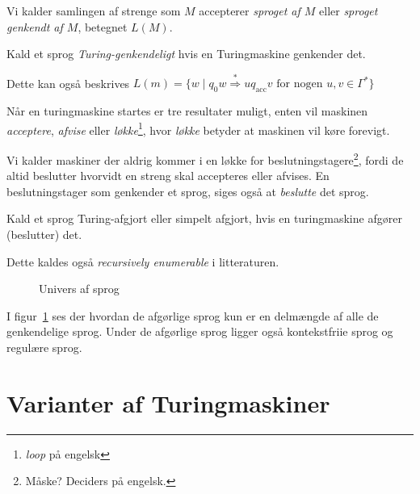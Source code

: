 Vi kalder samlingen af strenge som $M$ accepterer \textit{sproget af $M$} eller \textit{sproget genkendt af $M$}, betegnet $L(M)$.

\begin{definition}
Kald et sprog \textit{Turing-genkendeligt} hvis en Turingmaskine genkender det.
\end{definition}

Dette kan også beskrives $L(m) = \{w \mid q_{0}w \stackrel{*}{\Rightarrow} uq_{\text{acc}}v \text{ for nogen }u,v \in \Gamma^{*}\}$

Når en turingmaskine startes er tre resultater muligt, enten vil maskinen \textit{acceptere}, \textit{afvise} eller \textit{løkke}\footnote{\textit{loop} på engelsk}, hvor \textit{løkke} betyder at maskinen vil køre forevigt.



Vi kalder maskiner der aldrig kommer i en løkke for beslutningstagere\footnote{Måske? Deciders på engelsk.}, fordi de altid beslutter hvorvidt en streng skal accepteres eller afvises. En beslutningstager som genkender et sprog, siges også at \textit{beslutte} det sprog.

\begin{definition}
Kald et sprog Turing-afgjort eller simpelt afgjort, hvis en turingmaskine afgører (beslutter) det.
\end{definition}

Dette kaldes også \textit{recursively enumerable} i litteraturen.

\begin{figure}[ht]
  \centering
{}
  \caption{\label{fig:univers} Univers af sprog}
\end{figure}

I figur~\ref{fig:univers} ses der hvordan de afgørlige sprog kun er en delmængde af alle de genkendelige sprog. Under de afgørlige sprog ligger også kontekstfriie sprog og regulære sprog.




\section{Varianter af Turingmaskiner}%
\label{sec:turingvariants}

